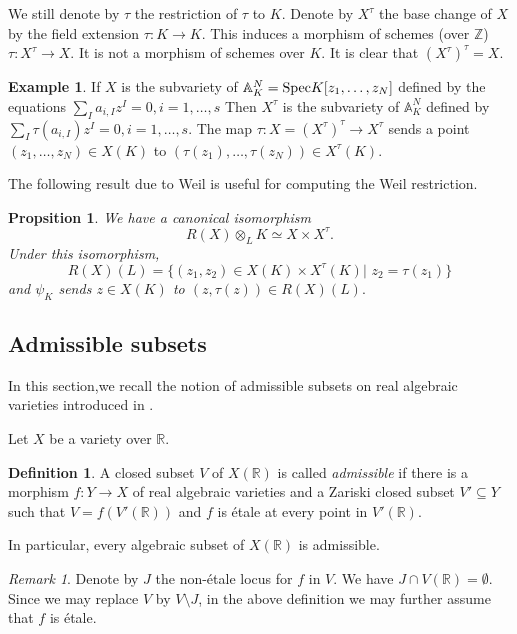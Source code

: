 \documentclass[12pt]{amsart}
\theoremstyle{plain}
\newtheorem{Prop}[Thm]{Propsition}
\theoremstyle{remark}
\newtheorem{Rem}[Thm]{Remark}
\theoremstyle{definition}
\newtheorem{Def}[Thm]{Definition}
\newtheorem{Eg}[Thm]{Example}
\def\A{\mathbb A}
\def\Z{\mathbb Z}
\def\R{\mathbb R}
\def\Spec{{\rm Spec}}
\begin{document}
We still denote by $\tau$ the restriction of $\tau$ to $K.$
Denote by $X^{\tau}$ the base change of $X$ by the field extension $\tau: K\to K$. This induces a morphism of schemes (over $\Z$) $\tau: X^{\tau}\to X$. It is not a morphism of schemes over $K$.
It is clear that $(X^{\tau})^{\tau}=X.$
\begin{Eg}
If $X$ is the subvariety of $\A^N_{K}=\Spec K[z_1,\dots, z_N]$ defined by the equations 
$\sum_{I}a_{i,I}z^I=0,  i=1,\dots, s$
Then $X^{\tau}$ is the subvariety of $\A^N_{K}$ defined by $\sum_{I}\tau(a_{i,I})z^I=0,  i=1,\dots, s$.
The map $\tau: X=(X^{\tau})^{\tau}\to X^{\tau}$ sends a point $(z_1,\dots,z_N)\in X(K)$ to $(\tau(z_1),\dots,\tau(z_N))\in X^{\tau}(K)$.
\end{Eg}

The following result due to Weil is useful for computing the Weil restriction.
\begin{Prop}\cite[Exercise 4.7]{Poonen2017}\label{proweilconj}
We have a canonical isomorphism $$R(X)\otimes_{L}K\simeq X\times X^{\tau}.$$ Under this isomorphism,  $$R(X)(L)=\{(z_1,z_2)\in X(K)\times X^{\tau}(K)|\,\, z_2=\tau(z_1)\}$$ and
$\psi_K$ sends $z\in X(K)$ to $(z,\tau(z))\in R(X)(L).$
\end{Prop}
















\subsection{Admissible subsets}
In this section,we recall the notion of admissible subsets on real algebraic varieties introduced in \cite{Ji2023}.

\medskip

Let $X$ be a variety over $\R$.
\begin{Def}\cite[Section 8.2]{Ji2023} A closed subset $V$ of $X(\R)$ is called \emph{admissible} if there is a morphism 
$f: Y\to X$ of real algebraic varieties and a Zariski closed subset $V'\subseteq Y$ such that 
$V=f(V'(\R))$ and $f$ is \'etale at every point in $V'(\R).$
\end{Def}

In particular, every algebraic subset of $X(\R)$ is admissible.

\begin{Rem}
Denote by $J$ the non-\'etale locus for $f$ in $V$. We have $J\cap V(\R)=\emptyset.$
Since we may replace $V$ by $V\setminus J$,  in the above definition we may further assume that $f$ is \'etale.
\end{Rem}
\end{document}
